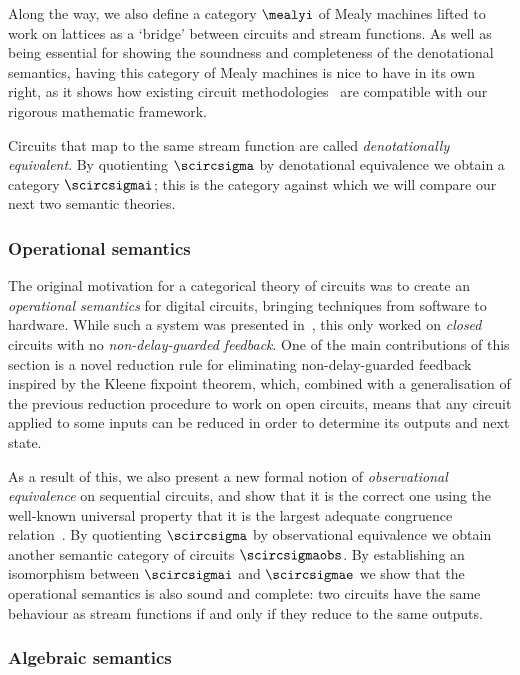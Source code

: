 Along the way, we also define a category \(\mealyi\)  of Mealy machines lifted
to work on lattices as a `bridge' between circuits and stream functions.
As well as being essential for showing the soundness and completeness of the
denotational semantics, having this category of Mealy machines is nice to have
in its own right, as it shows how existing circuit
methodologies~\cite{kohavi2009switching} are compatible with our rigorous
mathematic framework.

Circuits that map to the same stream function are called
\emph{denotationally equivalent}.
By quotienting \(\scircsigma\) by denotational equivalence we obtain a category
\(\scircsigmai\); this is the category against which we will compare our next
two semantic theories.

\subsubsection{Operational semantics}

The original motivation for a categorical theory of circuits was to create an
\emph{operational semantics} for digital circuits, bringing techniques from
software to hardware.
While such a system was presented in~\cite{ghica2017diagrammatic}, this only
worked on \emph{closed} circuits with no \emph{non-delay-guarded feedback}.
One of the main contributions of this section is a novel reduction rule for
eliminating non-delay-guarded feedback inspired by the Kleene fixpoint theorem,
which, combined with a generalisation of the previous reduction procedure to
work on open circuits, means that any circuit applied to some inputs can be
reduced in order to determine its outputs and next state.

As a result of this, we also present a new formal notion of
\emph{observational equivalence} on sequential circuits, and show that it is the
correct one using the well-known universal property that it is the largest
adequate congruence relation~\cite{gordon1998operational}.
By quotienting \(\scircsigma\) by observational equivalence we obtain another
semantic category of circuits \(\scircsigmaobs\).
By establishing an isomorphism between \(\scircsigmai\) and \(\scircsigmae\)
we show that the operational semantics is also sound and complete: two circuits
have the same behaviour as stream functions if and only if they reduce to the
same outputs.

\subsubsection{Algebraic semantics}

